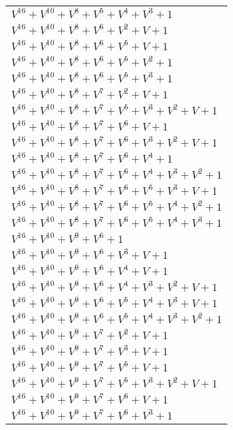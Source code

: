 \documentclass[12pt]{article}
\begin{document}
\begin{adjustwidth}{-4cm}{}
\begin{center}
\begin{longtable}{|l|}
$V^{16}  +V^{10}  +V^{8}  +V^{5}  +V^{4}  +V^{3}  + 1$ \\
$V^{16}  +V^{10}  +V^{8}  +V^{6}  +V^{2}  + V + 1$ \\
$V^{16}  +V^{10}  +V^{8}  +V^{6}  +V^{5}  + V + 1$ \\
$V^{16}  +V^{10}  +V^{8}  +V^{6}  +V^{5}  +V^{2}  + 1$ \\
$V^{16}  +V^{10}  +V^{8}  +V^{6}  +V^{5}  +V^{3}  + 1$ \\
$V^{16}  +V^{10}  +V^{8}  +V^{7}  +V^{2}  + V + 1$ \\
$V^{16}  +V^{10}  +V^{8}  +V^{7}  +V^{5}  +V^{3}  +V^{2}  + V + 1$ \\
$V^{16}  +V^{10}  +V^{8}  +V^{7}  +V^{6}  + V + 1$ \\
$V^{16}  +V^{10}  +V^{8}  +V^{7}  +V^{6}  +V^{3}  +V^{2}  + V + 1$ \\
$V^{16}  +V^{10}  +V^{8}  +V^{7}  +V^{6}  +V^{4}  + 1$ \\
$V^{16}  +V^{10}  +V^{8}  +V^{7}  +V^{6}  +V^{4}  +V^{3}  +V^{2}  + 1$ \\
$V^{16}  +V^{10}  +V^{8}  +V^{7}  +V^{6}  +V^{5}  +V^{3}  + V + 1$ \\
$V^{16}  +V^{10}  +V^{8}  +V^{7}  +V^{6}  +V^{5}  +V^{4}  +V^{2}  + 1$ \\
$V^{16}  +V^{10}  +V^{8}  +V^{7}  +V^{6}  +V^{5}  +V^{4}  +V^{3}  + 1$ \\
$V^{16}  +V^{10}  +V^{9}  +V^{6}  + 1$ \\
$V^{16}  +V^{10}  +V^{9}  +V^{6}  +V^{3}  + V + 1$ \\
$V^{16}  +V^{10}  +V^{9}  +V^{6}  +V^{4}  + V + 1$ \\
$V^{16}  +V^{10}  +V^{9}  +V^{6}  +V^{4}  +V^{3}  +V^{2}  + V + 1$ \\
$V^{16}  +V^{10}  +V^{9}  +V^{6}  +V^{5}  +V^{4}  +V^{3}  + V + 1$ \\
$V^{16}  +V^{10}  +V^{9}  +V^{6}  +V^{5}  +V^{4}  +V^{3}  +V^{2}  + 1$ \\
$V^{16}  +V^{10}  +V^{9}  +V^{7}  +V^{2}  + V + 1$ \\
$V^{16}  +V^{10}  +V^{9}  +V^{7}  +V^{3}  + V + 1$ \\
$V^{16}  +V^{10}  +V^{9}  +V^{7}  +V^{5}  + V + 1$ \\
$V^{16}  +V^{10}  +V^{9}  +V^{7}  +V^{5}  +V^{3}  +V^{2}  + V + 1$ \\
$V^{16}  +V^{10}  +V^{9}  +V^{7}  +V^{6}  + V + 1$ \\
$V^{16}  +V^{10}  +V^{9}  +V^{7}  +V^{6}  +V^{3}  + 1$ \\

\end{longtable}
\end{center}
\end{adjustwidth}
\end{document}
